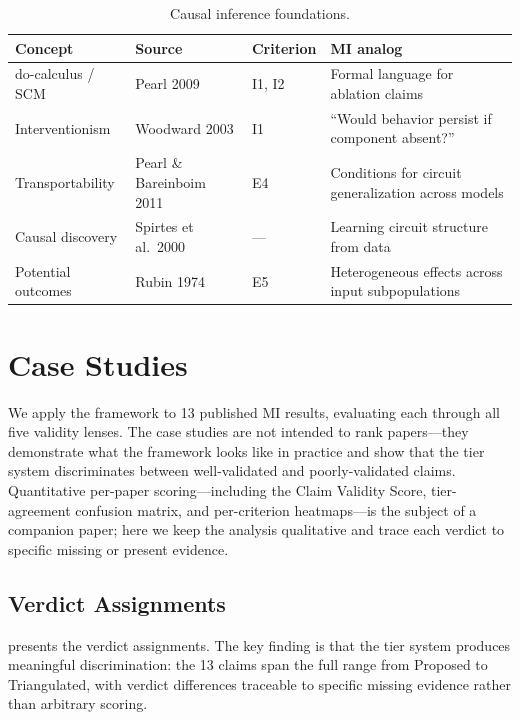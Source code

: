 \documentclass[10pt]{article}
\begin{document}
\begin{table}[H]
\centering\small
\caption{Causal inference foundations.}
\renewcommand{\arraystretch}{1.12}
\begin{tabular}{@{}l>{\raggedright\arraybackslash}p{2.5cm}l>{\raggedright\arraybackslash}p{4.2cm}@{}}
\toprule
\textbf{Concept} & \textbf{Source} & \textbf{Criterion} & \textbf{MI analog} \\
\midrule
do-calculus / SCM & Pearl 2009 & I1, I2 & Formal language for ablation claims \\
\midrule
Interventionism & Woodward 2003 & I1 & ``Would behavior persist if component absent?'' \\
\midrule
Transportability & Pearl \& Bareinboim 2011 & E4 & Conditions for circuit generalization across models \\
\midrule
Causal discovery & Spirtes et al.\ 2000 & --- & Learning circuit structure from data \\
\midrule
Potential outcomes & Rubin 1974 & E5 & Heterogeneous effects across input subpopulations \\
\bottomrule
\end{tabular}
\end{table}

\section{Case Studies}
\label{sec:case-studies}

We apply the framework to 13 published MI results, evaluating each through all five validity lenses. The case studies are not intended to rank papers---they demonstrate what the framework looks like in practice and show that the tier system discriminates between well-validated and poorly-validated claims. Quantitative per-paper scoring---including the Claim Validity Score, tier-agreement confusion matrix, and per-criterion heatmaps---is the subject of a companion paper; here we keep the analysis qualitative and trace each verdict to specific missing or present evidence.

\subsection{Verdict Assignments}

 presents the verdict assignments. The key finding is that the tier system produces meaningful discrimination: the 13 claims span the full range from Proposed to Triangulated, with verdict differences traceable to specific missing evidence rather than arbitrary scoring.
\end{document}
